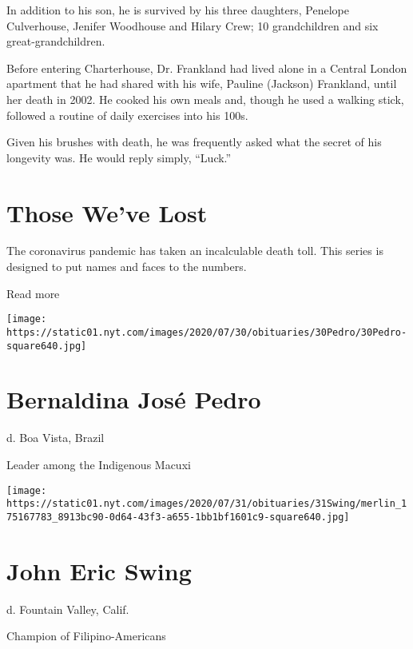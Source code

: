 In addition to his son, he is survived by his three daughters, Penelope
Culverhouse, Jenifer Woodhouse and Hilary Crew; 10 grandchildren and six
great-grandchildren.

Before entering Charterhouse, Dr. Frankland had lived alone in a Central
London apartment that he had shared with his wife, Pauline (Jackson)
Frankland, until her death in 2002. He cooked his own meals and, though
he used a walking stick, followed a routine of daily exercises into his
100s.

Given his brushes with death, he was frequently asked what the secret of
his longevity was. He would reply simply, ``Luck.''

\href{https://www.nytimes.com/interactive/2020/obituaries/people-died-coronavirus-obituaries.html?action=click\&pgtype=Article\&state=default\&region=BELOW_MAIN_CONTENT\&context=covid_obits_promo}{}

\hypertarget{those-weve-lost}{%
\section{Those We've Lost}\label{those-weve-lost}}

The coronavirus pandemic has taken an incalculable death toll. This
series is designed to put names and faces to the numbers.

Read more

\texttt{[image: https://static01.nyt.com/images/2020/07/30/obituaries/30Pedro/30Pedro-square640.jpg]}

\hypertarget{bernaldina-josuxe9-pedro}{%
\section{Bernaldina José Pedro}\label{bernaldina-josuxe9-pedro}}

d. Boa Vista, Brazil

Leader among the Indigenous Macuxi

\texttt{[image: https://static01.nyt.com/images/2020/07/31/obituaries/31Swing/merlin\_175167783\_8913bc90-0d64-43f3-a655-1bb1bf1601c9-square640.jpg]}

\hypertarget{john-eric-swing}{%
\section{John Eric Swing}\label{john-eric-swing}}

d. Fountain Valley, Calif.

Champion of Filipino-Americans

